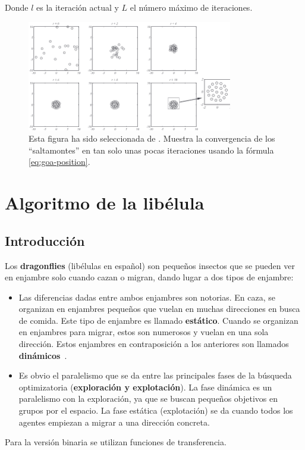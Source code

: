 Donde $l$ es la iteración actual y $L$ el número máximo de iteraciones.

\begin{figure}[H]
    \begin{center}
        \includegraphics[width=0.8\textwidth]{imagenes/goa-position-convergence.png}
    \end{center}
    \caption[Convergencia en GOA]{Esta figura ha sido seleccionada de \cite{saremi_grasshopper_2017}. Muestra la convergencia de los ``saltamontes'' en tan solo unas pocas iteraciones usando la fórmula \ref{eq:goa-position}.}
\end{figure}

\section{Algoritmo de la libélula}
\subsection{Introducción}
Los \textbf{dragonflies} (libélulas en español) son pequeños insectos que se pueden ver en enjambre solo cuando cazan o migran, dando lugar a dos tipos de enjambre:
\begin{itemize}
    \item Las diferencias dadas entre ambos enjambres son notorias. En caza, se organizan en enjambres pequeños que vuelan en muchas direcciones en busca de comida. Este tipo de enjambre es llamado \textbf{estático}. Cuando se organizan en enjambres para migrar, estos son numerosos y vuelan en una sola dirección. Estos enjambres en contraposición a los anteriores son llamados \textbf{dinámicos}~\cite{mirjalili_dragonfly_2016}.
    \item Es obvio el paralelismo que se da entre las principales fases de la búsqueda optimizatoria (\textbf{exploración y explotación}). La fase dinámica es un paralelismo con la exploración, ya que se buscan pequeños objetivos en grupos por el espacio. La fase estática (explotación) se da cuando todos los agentes empiezan a migrar a una dirección concreta.
\end{itemize}
Para la versión binaria se utilizan funciones de transferencia.

